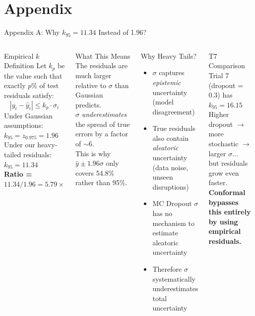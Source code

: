 \documentclass[aspectratio=169,10pt]{beamer}
\newcommand{\emphblue}[1]{\textcolor{tumblue}{\textbf{#1}}}
\newcommand{\emphred}[1]{\textcolor{tumred}{\textbf{#1}}}
\begin{document}
\appendix
\section{Appendix}

\begin{frame}{Appendix A: Why $k_{95} = 11.34$ Instead of 1.96?}
  \begin{columns}[c]
      \begin{block}{Empirical $k$ Definition}
        Let $k_p$ be the value such that exactly $p$\% of test residuals satisfy:
        \[
          |y_i - \hat{y}_i| \leq k_p \cdot \sigma_i
        \]
        Under Gaussian assumptions: $k_{95} = z_{0.975} = 1.96$\\[0.3em]
        Under our heavy-tailed residuals: $k_{95} = 11.34$\\[0.3em]
        \emphred{Ratio = $11.34 / 1.96 = 5.79 \times$}
      \end{block}
      \vspace{0.4em}
      \begin{block}{What This Means}
        The residuals are much larger relative to $\sigma$ than Gaussian predicts.\\
        $\sigma$ \emph{underestimates} the spread of true errors by a factor of $\sim 6$.\\
        This is why $\hat{y} \pm 1.96\sigma$ only covers 54.8\% rather than 95\%.
      \end{block}
      \begin{exampleblock}{Why Heavy Tails?}
        \begin{itemize}
          \item $\sigma$ captures \emph{epistemic} uncertainty (model disagreement)
          \item True residuals also contain \emph{aleatoric} uncertainty (data noise, unseen disruptions)
          \item MC Dropout $\sigma$ has no mechanism to estimate aleatoric uncertainty
          \item Therefore $\sigma$ systematically underestimates total uncertainty
        \end{itemize}
      \end{exampleblock}
      \vspace{0.4em}
      \begin{block}{T7 Comparison}
        Trial 7 (dropout = 0.3) has $k_{95} = 16.15$\\
        Higher dropout $\to$ more stochastic $\to$ larger $\sigma$...\\
        but residuals grow even faster.\\
        \emphblue{Conformal bypasses this entirely by using empirical residuals.}
      \end{block}
  \end{columns}
\end{frame}
\end{document}
